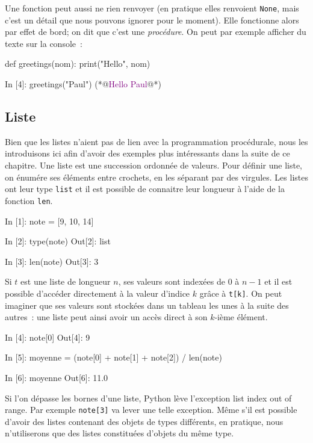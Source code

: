 \documentclass{magnoliaold}
\begin{document}
Une fonction peut aussi ne rien renvoyer (en pratique elles renvoient \verb!None!, mais c'est un détail que
nous pouvons ignorer pour le moment). Elle fonctionne alors par effet de bord; on dit que
c'est une \emph{procédure}. On peut par exemple afficher du texte sur la console~:

\begin{pythoncodeline}
def greetings(nom):
    print("Hello", nom)
\end{pythoncodeline}

\begin{pythoncode}
In [4]: greetings("Paul")
(*@\textcolor{purple}{Hello Paul}@*)
\end{pythoncode}



\subsection{Liste}

Bien que les listes n'aient pas de lien avec la programmation procédurale, nous les introduisons ici
afin d'avoir des exemples plus intéressants dans la suite de ce chapitre.
Une liste est une succession ordonnée de valeurs. Pour définir une liste, on
énumére ses éléments entre crochets, en les séparant par des virgules. Les listes ont leur type
\verb!list! et il est possible de connaitre leur longueur à l'aide de la fonction
\verb!len!.

\begin{pythoncode}
In [1]: note = [9, 10, 14]

In [2]: type(note)
Out[2]: list

In [3]: len(note)
Out[3]: 3
\end{pythoncode}

\noindent
Si $t$ est une liste de longueur $n$, ses valeurs sont indexées de 0 à $n-1$ et il
est possible d'accéder directement à la valeur d'indice $k$ grâce à \verb_t[k]_.
On peut imaginer que ses valeurs sont stockées dans un tableau les unes à la suite des
autres~: une liste peut ainsi avoir un accès direct à son $k$-ième élément.

\begin{pythoncode}
In [4]: note[0]
Out[4]: 9

In [5]: moyenne = (note[0] + note[1] + note[2]) / len(note)

In [6]: moyenne
Out[6]: 11.0
\end{pythoncode}

\noindent
Si l'on dépasse les bornes d'une liste, Python lève l'exception \og list index out of range\fg. Par exemple \verb_note[3]_ va lever une telle exception. Même s'il est possible d'avoir des listes contenant des objets de types
différents, en pratique, nous n'utiliserons que des listes constituées d'objets du même type.\\
\end{document}
